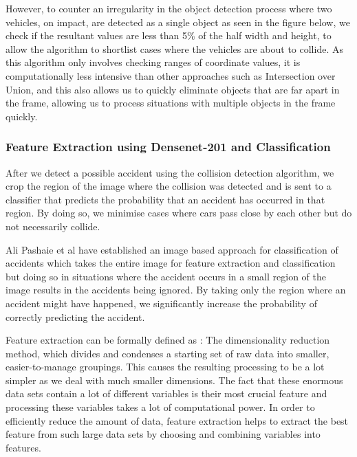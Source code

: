 \documentclass[ 12pt,a4paper,twocolumn,fleqn]{article}
\begin{document}
\begin{adjustwidth}{3.5em}{0pt}
However, to counter an irregularity in the object detection process where two vehicles, on impact, are detected as a single object as seen in the figure below, we check if the resultant values are less than 5\% of the half width and height, to allow the algorithm to shortlist cases where the vehicles are about to collide. 
\hspace{0.2cm}
As this algorithm only involves checking ranges of coordinate values, it is computationally less intensive than other approaches such as Intersection over Union, and this also allows us to quickly eliminate objects that are far apart in the frame, allowing us to process situations with multiple objects in the frame quickly.

\hspace{0.2cm}


\subsubsection{Feature Extraction using Densenet-201 and Classification}

After we detect a possible accident using the collision detection algorithm, we crop the region of the image where the collision was detected and is sent to a classifier that predicts the probability that an accident has occurred in that region. By doing so, we minimise cases where cars pass close by each other but do not necessarily collide.

\hspace{0.2cm}

Ali Pashaie et al have established an image based approach for classification of accidents which takes the entire image for feature extraction and classification but doing so in situations where the accident occurs in a small region of the image results in the accidents being ignored. By taking only the region where an accident might have happened, we significantly increase the probability of correctly predicting the accident.

\hspace{0.2cm}

Feature extraction can be formally defined as : The dimensionality reduction method, which divides and condenses a starting set of raw data into smaller, easier-to-manage groupings.
This causes the resulting processing to be a lot simpler as we deal with much smaller dimensions. The fact that these enormous data sets contain a lot of different variables is their most crucial feature and processing these variables takes a lot of computational power.
In order to efficiently reduce the amount of data, feature extraction helps to extract the best feature from such large data sets by choosing and combining variables into features.
\hspace{0.2cm}


\end{adjustwidth}
\end{document}
